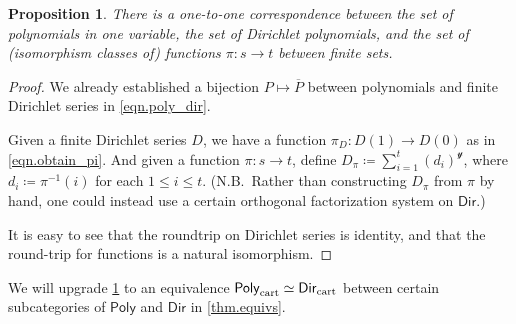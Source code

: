 \documentclass[11pt, article, one side]{memoir}
\theoremstyle{theorem}
\newtheorem{proposition}[section]{Proposition}
\theoremstyle{definition}
\theoremstyle{remark}
\newcommand{\Cat}[1]{\mathsf{#1}}%
\newcommand{\tn}[1]{\textnormal{#1}}
\newcommand{\inv}{^{-1}}
\newcommand{\yon}{\mathcal{y}}
\newcommand{\poly}{\Cat{Poly}}
\newcommand{\dir}{\Cat{Dir}}
\begin{document}
\begin{proposition}\label{prop.poly_function}
There is a one-to-one correspondence between the set of polynomials in one variable, the set of Dirichlet polynomials, and the set of (isomorphism classes of) functions $\pi\colon s\to t$ between finite sets.
\end{proposition}
\begin{proof}
We already established a bijection $P\mapsto\overline{P}$ between polynomials and finite Dirichlet series in \cref{eqn.poly_dir}.

Given a finite Dirichlet series $D$, we have a function $\pi_D\colon D(1)\to D(0)$ as in \cref{eqn.obtain_pi}. And given a function $\pi\colon s\to t$, define $D_\pi\coloneqq\sum_{i=1}^t(d_i)^\yon$, where $d_i\coloneqq\pi\inv(i)$ for each $1\leq i\leq t$. (N.B.\ Rather than constructing $D_\pi$ from $\pi$ by hand, one could instead use a certain orthogonal factorization system on $\dir$.)

It is easy to see that the roundtrip on Dirichlet series is identity, and that the round-trip for functions is a natural isomorphism.
\end{proof}

We will upgrade \cref{prop.poly_function} to an equivalence $\poly_{\tn{cart}} \simeq \dir_{\tn{cart}}$ between certain subcategories of $\poly$ and $\dir$ in \cref{thm.equivs}.
\end{document}
